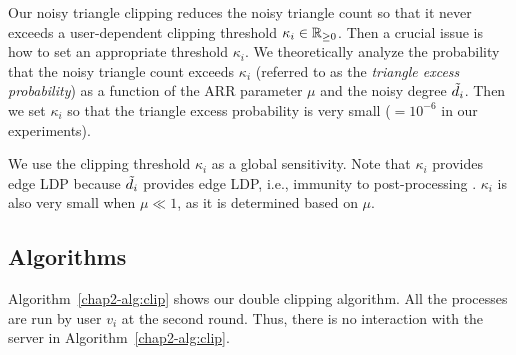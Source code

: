 Our noisy triangle clipping reduces the noisy triangle count so that it never exceeds a 
user-dependent clipping threshold 
$\kappa_i \in \mathbb{R}_{\ge0}$. 
Then a crucial issue is how to set 
an appropriate 
threshold 
$\kappa_i$. 
We theoretically analyze the probability that the noisy triangle count exceeds $\kappa_i$ 
(referred to as the \textit{triangle excess probability}) 
as a function of 
the ARR parameter $\mu$ and the 
noisy degree $\tilde{d}_i$. 
Then we set $\kappa_i$ so that 
the triangle excess probability 
is very small ($=10^{-6}$ in our experiments). 

We use the clipping threshold $\kappa_i$ as a global sensitivity. 
Note that $\kappa_i$ provides edge LDP because $\tilde{d}_i$ provides edge LDP, 
i.e., immunity to post-processing \cite{DP}. 
$\kappa_i$ is also very small when $\mu \ll 1$, as it is determined based on $\mu$. 


\subsection{Algorithms}
\label{chap2-sub:algorithms}
Algorithm~\ref{chap2-alg:clip} shows our double clipping algorithm. 
All the processes are run by user $v_i$ at the second round. 
Thus, there is no interaction with the server in Algorithm~\ref{chap2-alg:clip}.

